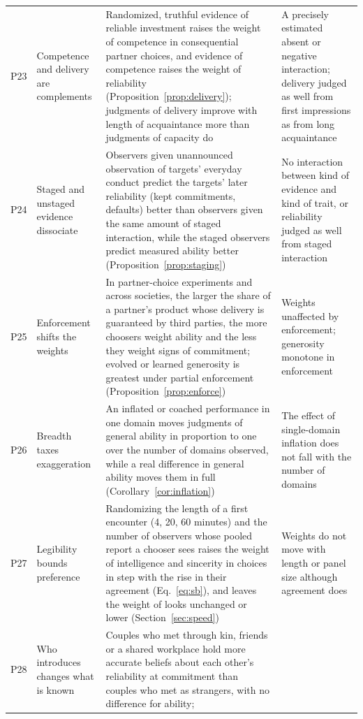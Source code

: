 \begin{table}[tp]
\begin{tabularx}{\textwidth}{@{}P{0.028\textwidth}P{0.19\textwidth}LP{0.25\textwidth}@{}}
P23 & Competence and delivery are complements & Randomized, truthful evidence of reliable investment raises the weight of
competence in consequential partner choices, and evidence of competence raises the weight of reliability
(Proposition~\ref{prop:delivery}); judgments of delivery improve with length of acquaintance more than judgments of capacity
do & A precisely estimated absent or negative interaction; delivery judged as well from first impressions as from long
acquaintance\\
P24 & Staged and unstaged evidence dissociate & Observers given unannounced observation of targets' everyday conduct predict
the targets' later reliability (kept commitments, defaults) better than observers given the same amount of staged
interaction, while the staged observers predict measured ability better (Proposition~\ref{prop:staging}) & No interaction
between kind of evidence and kind of trait, or reliability judged as well from staged interaction\\
P25 & Enforcement shifts the weights & In partner-choice experiments and across societies, the larger the share of a
partner's product whose delivery is guaranteed by third parties, the more choosers weight ability and the less they weight
signs of commitment; evolved or learned generosity is greatest under partial enforcement
(Proposition~\ref{prop:enforce}) & Weights unaffected by enforcement; generosity monotone in enforcement\\
P26 & Breadth taxes exaggeration & An inflated or coached performance in one domain moves judgments of general ability in
proportion to one over the number of domains observed, while a real difference in general ability moves them in full
(Corollary~\ref{cor:inflation}) & The effect of single-domain inflation does not fall with the number of domains\\
P27 & Legibility bounds preference & Randomizing the length of a first encounter (4, 20, 60 minutes) and the number of
observers whose pooled report a chooser sees raises the weight of intelligence and sincerity in choices in step with the
rise in their agreement (Eq.~\ref{eq:sb}), and leaves the weight of looks unchanged or lower (Section~\ref{sec:speed}) &
Weights do not move with length or panel size although agreement does\\
P28 & Who introduces changes what is known & Couples who met through kin, friends or a shared workplace hold more accurate
beliefs about each other's reliability at commitment than couples who met as strangers, with no difference for ability;

\end{tabularx}
\end{table}
